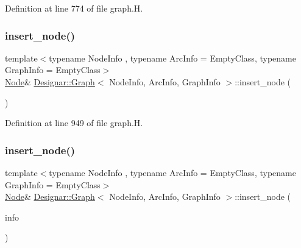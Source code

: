 Definition at line 774 of file graph.\+H.

\mbox{\label{class_designar_1_1_graph_a5da24cc7de9ae39b1df684cb75782fed}} 
\subsubsection{\texorpdfstring{insert\+\_\+node()}{insert\_node()}\hspace{0.1cm}{\footnotesize\ttfamily [2/4]}}
{\footnotesize\ttfamily template$<$typename Node\+Info , typename Arc\+Info  = Empty\+Class, typename Graph\+Info  = Empty\+Class$>$ \\
\hyperlink{class_designar_1_1_graph_a5dfc7dba9d092ac489c72e40390c37d0}{Node}\& \hyperlink{class_designar_1_1_graph}{Designar\+::\+Graph}$<$ Node\+Info, Arc\+Info, Graph\+Info $>$\+::insert\+\_\+node (\begin{DoxyParamCaption}{ }\end{DoxyParamCaption})\hspace{0.3cm}{\ttfamily [inline]}}



Definition at line 949 of file graph.\+H.

\mbox{\label{class_designar_1_1_graph_a573d7ab63075e30bc8c5aaa2a80548ec}} 
\subsubsection{\texorpdfstring{insert\+\_\+node()}{insert\_node()}\hspace{0.1cm}{\footnotesize\ttfamily [3/4]}}
{\footnotesize\ttfamily template$<$typename Node\+Info , typename Arc\+Info  = Empty\+Class, typename Graph\+Info  = Empty\+Class$>$ \\
\hyperlink{class_designar_1_1_graph_a5dfc7dba9d092ac489c72e40390c37d0}{Node}\& \hyperlink{class_designar_1_1_graph}{Designar\+::\+Graph}$<$ Node\+Info, Arc\+Info, Graph\+Info $>$\+::insert\+\_\+node (\begin{DoxyParamCaption}\item[{const Node\+Info \&}]{info }\end{DoxyParamCaption})\hspace{0.3cm}{\ttfamily [inline]}}




